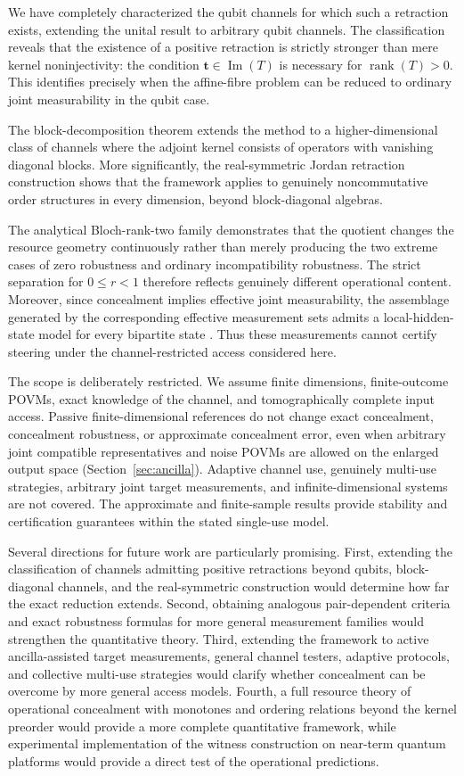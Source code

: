 \documentclass[
aps,pra,twocolumn,10pt,
superscriptaddress,longbibliography,floatfix
]{revtex4-2}
\DeclareMathOperator{\rank}{rank}
\DeclareMathOperator{\im}{Im}
\begin{document}
We have completely characterized the qubit channels for which such a retraction exists, extending the unital result to arbitrary qubit channels. The classification reveals that the existence of a positive retraction is strictly stronger than mere kernel noninjectivity: the condition $\mathbf t\in\im(T)$ is necessary for $\rank(T)>0$. This identifies precisely when the affine-fibre problem can be reduced to ordinary joint measurability in the qubit case.

The block-decomposition theorem extends the method to a higher-dimensional class of channels where the adjoint kernel consists of operators with vanishing diagonal blocks. More significantly, the real-symmetric Jordan retraction construction shows that the framework applies to genuinely noncommutative order structures in every dimension, beyond block-diagonal algebras.

The analytical Bloch-rank-two family demonstrates that the quotient changes the resource geometry continuously rather than merely producing the two extreme cases of zero robustness and ordinary incompatibility robustness. The strict separation for $0\le r<1$ therefore reflects genuinely different operational content. Moreover, since concealment implies effective joint measurability, the assemblage generated by the corresponding effective measurement sets admits a local-hidden-state model for every bipartite state \cite{Uola2015}. Thus these measurements cannot certify steering under the channel-restricted access considered here.

The scope is deliberately restricted. We assume finite dimensions, finite-outcome POVMs, exact knowledge of the channel, and tomographically complete input access. Passive finite-dimensional references do not change exact concealment, concealment robustness, or approximate concealment error, even when arbitrary joint compatible representatives and noise POVMs are allowed on the enlarged output space (Section~\ref{sec:ancilla}). Adaptive channel use, genuinely multi-use strategies, arbitrary joint target measurements, and infinite-dimensional systems are not covered. The approximate and finite-sample results provide stability and certification guarantees within the stated single-use model.

Several directions for future work are particularly promising. First, extending the classification of channels admitting positive retractions beyond qubits, block-diagonal channels, and the real-symmetric construction would determine how far the exact reduction extends. Second, obtaining analogous pair-dependent criteria and exact robustness formulas for more general measurement families would strengthen the quantitative theory. Third, extending the framework to active ancilla-assisted target measurements, general channel testers, adaptive protocols, and collective multi-use strategies would clarify whether concealment can be overcome by more general access models. Fourth, a full resource theory of operational concealment with monotones and ordering relations beyond the kernel preorder would provide a more complete quantitative framework, while experimental implementation of the witness construction on near-term quantum platforms would provide a direct test of the operational predictions.
\end{document}
